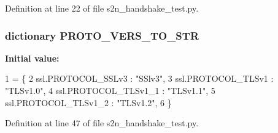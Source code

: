 Definition at line 22 of file s2n\+\_\+handshake\+\_\+test.\+py.

\subsubsection[{\texorpdfstring{P\+R\+O\+T\+O\+\_\+\+V\+E\+R\+S\+\_\+\+T\+O\+\_\+\+S\+TR}{PROTO_VERS_TO_STR}}]{\setlength{\rightskip}{0pt plus 5cm}dictionary P\+R\+O\+T\+O\+\_\+\+V\+E\+R\+S\+\_\+\+T\+O\+\_\+\+S\+TR}\hypertarget{namespaces2n__handshake__test_a58e49fbf9e2d2275dc26b83ca33c2be5}{}\label{namespaces2n__handshake__test_a58e49fbf9e2d2275dc26b83ca33c2be5}
{\bfseries Initial value\+:}
\begin{DoxyCode}
1 = \{
2     ssl.PROTOCOL\_SSLv3 : \textcolor{stringliteral}{"SSlv3"},
3     ssl.PROTOCOL\_TLSv1 : \textcolor{stringliteral}{"TLSv1.0"},
4     ssl.PROTOCOL\_TLSv1\_1 : \textcolor{stringliteral}{"TLSv1.1"},
5     ssl.PROTOCOL\_TLSv1\_2 : \textcolor{stringliteral}{"TLSv1.2"},
6 \}
\end{DoxyCode}


Definition at line 47 of file s2n\+\_\+handshake\+\_\+test.\+py.

